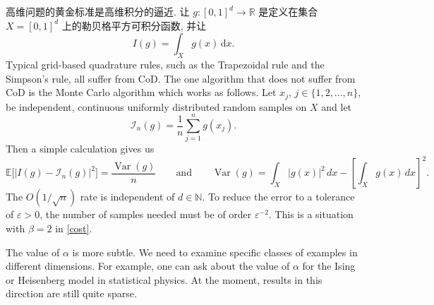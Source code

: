 \documentclass[12pt,AutoFakeBold,AutoFakeSlant]{article}
\theoremstyle{definition}
\newcommand{\R}{\mathbb{R}}
\newcommand{\EE}{\mathbb{E}}
\newcommand{\N}{\mathbb{N}}
\newcommand{\bx}{{x}}
\newcommand{\eps}{\varepsilon}
\begin{document}
	高维问题的黄金标准是高维积分的逼近. 让 $ g \colon [0,1]^d \to \R $ 是定义在集合 $ X = [0, 1]^d $ 上的勒贝格平方可积分函数, 并让
	\begin{equation}
		\label{eq:integral_intro}
		I(g) = \int_{X} g(\bx) \, \text{d} x .
	\end{equation}
	Typical grid-based quadrature rules, such as the Trapezoidal rule and the Simpson's rule,
	all suffer from  CoD. The one algorithm that does not suffer from CoD
	is the Monte Carlo algorithm which works as follows.
	Let $ \bx_j $, $ j \in \{ 1, 2, \dots, n \} $, be 
	independent, continuous uniformly distributed random samples on $ X $ and let
	\begin{equation}
	\mathcal{I}_n(g) = \frac 1n \sum_{ j = 1 }^n g(\bx_j)
	.
	\end{equation}
	Then a simple calculation gives us
	\begin{equation}
	\EE\big[ | I(g) - \mathcal{I}_n(g) |^2 \big] 
	= \frac{\operatorname{Var}(g)}n
	\qquad 
	\text{and}
	\qquad
	\operatorname{Var}(g) 
	= \int_X | g(\bx) |^2 \, d\bx 
	- 
	\left[ \int_X g(\bx) \, d\bx \right]^2.
	\label{MC-rate}
	\end{equation}
	The $O(1/\sqrt{n})$ rate is independent of $ d \in \N $.
	To reduce the error to a tolerance of $ \eps > 0 $, 
	the number of samples needed must be of order $ \eps^{ - 2 } $.
	This is a situation with $\beta=2$ in \eqref{cost}.

	The value of $\alpha$ is more subtle. We need to examine specific classes of examples in different
	dimensions.  For example, one can ask about the value of $\alpha$ for the Ising or Heisenberg model in
	statistical physics.  At the moment, results in this direction are still quite sparse.
\end{document}
